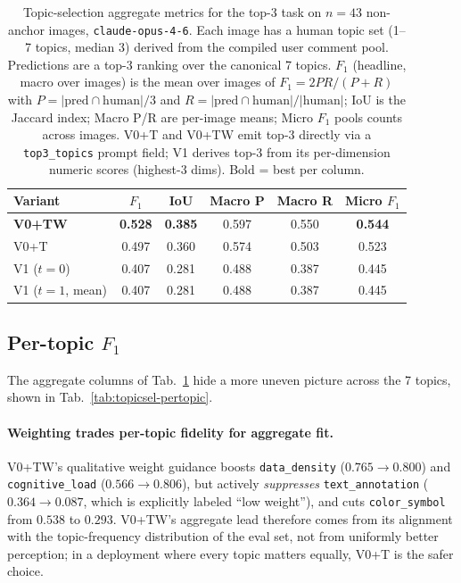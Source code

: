 \begin{table}[h]
\centering
\caption{Topic-selection aggregate metrics for the top-3 task on
$n = 43$ non-anchor images, \texttt{claude-opus-4-6}. Each image has a
human topic set (1--7 topics, median 3) derived from the compiled user
comment pool. Predictions are a top-3 ranking over the canonical 7
topics. $F_1$ (headline, macro over images) is the mean over images
of $F_1 = 2PR/(P+R)$ with $P = |\text{pred} \cap \text{human}|/3$ and
$R = |\text{pred} \cap \text{human}|/|\text{human}|$;
IoU is the Jaccard index; Macro P/R are per-image means; Micro $F_1$
pools counts across images. V0+T and V0+TW emit top-3 directly via a
\texttt{top3\_topics} prompt field; V1 derives top-3 from its
per-dimension numeric scores (highest-3 dims). Bold = best per
column.}
\label{tab:topicsel-agg}
\scriptsize
\begin{tabular*}{\linewidth}{@{\extracolsep{\fill}}lccccc@{}}
\toprule
Variant & $F_1$ & IoU & Macro P & Macro R & Micro $F_1$ \\
\midrule
\textbf{V0+TW}      & \textbf{0.528} & \textbf{0.385} & 0.597 & 0.550 & \textbf{0.544} \\
V0+T                & 0.497 & 0.360 & 0.574 & 0.503 & 0.523 \\
V1 ($t=0$)          & 0.407 & 0.281 & 0.488 & 0.387 & 0.445 \\
V1 ($t=1$, mean)    & 0.407 & 0.281 & 0.488 & 0.387 & 0.445 \\
\bottomrule
\end{tabular*}
\end{table}

\subsection{Per-topic $F_1$}

The aggregate columns of Tab.~\ref{tab:topicsel-agg} hide a more
uneven picture across the 7 topics, shown in
Tab.~\ref{tab:topicsel-pertopic}.

\paragraph{Weighting trades per-topic fidelity for aggregate fit.}
V0+TW's qualitative weight guidance boosts \texttt{data\_density}
($0.765 \to 0.800$) and \texttt{cognitive\_load} ($0.566 \to 0.806$),
but actively \emph{suppresses} \texttt{text\_annotation}
($0.364 \to 0.087$, which is explicitly labeled ``low weight''),
and cuts \texttt{color\_symbol} from $0.538$ to $0.293$. V0+TW's
aggregate lead therefore comes from its alignment with the
topic-frequency distribution of the eval set, not from uniformly
better perception; in a deployment where every topic matters
equally, V0+T is the safer choice.


